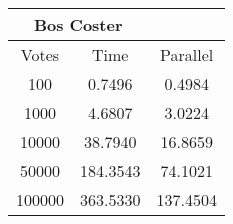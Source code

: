 \documentclass{standalone}
\begin{document}
\begin{tabular}{| c | c | c |}
    \hline
    \multicolumn{2}{|c|}{Bos Coster}\\  %
    \hline                              %
    Votes & Time & Parallel\\ \hline
    100 & 0.7496 & 0.4984\\ \hline
    1000 & 4.6807 & 3.0224\\ \hline
    10000 & 38.7940 & 16.8659\\ \hline
    50000 & 184.3543 & 74.1021\\ \hline
    100000 & 363.5330 & 137.4504\\      %
    \hline
\end{tabular}
\end{document}
